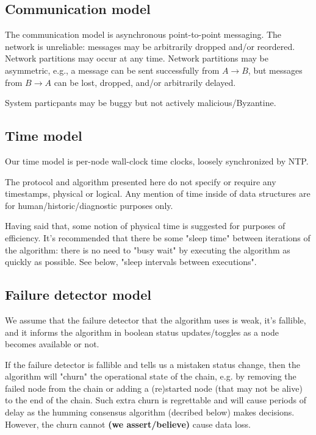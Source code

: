 \documentclass[preprint,10pt]{sigplanconf}
\begin{document}
\subsection{Communication model}

The communication model is asynchronous point-to-point messaging.
The network is unreliable: messages may be arbitrarily dropped and/or
reordered.  Network partitions may occur at any time.
Network partitions may be asymmetric, e.g., a message can be sent successfully
from $A \rightarrow B$, but messages from $B \rightarrow A$ can be
lost, dropped, and/or arbitrarily delayed.

System particpants may be buggy but not actively malicious/Byzantine.

\subsection{Time model}
\label{sub:time-model}

Our time model is per-node wall-clock time clocks, loosely
synchronized by NTP.

The protocol and algorithm presented here do not specify or require any
timestamps, physical or logical.  Any mention of time inside of data
structures are for human/historic/diagnostic purposes only.

Having said that, some notion of physical time is suggested for
purposes of efficiency.  It's recommended that there be some "sleep
time" between iterations of the algorithm: there is no need to "busy
wait" by executing the algorithm as quickly as possible.  See below,
"sleep intervals between executions".

\subsection{Failure detector model}

We assume that the failure detector that the algorithm uses is weak,
it's fallible, and it informs the algorithm in boolean status
updates/toggles as a node becomes available or not.

If the failure detector is fallible and tells us a mistaken status
change, then the algorithm will "churn" the operational state of the
chain, e.g. by removing the failed node from the chain or adding a
(re)started node (that may not be alive) to the end of the chain.
Such extra churn is regrettable and will cause periods of delay as the
humming consensus algorithm (decribed below) makes decisions.  However, the
churn cannot {\bf (we assert/believe)} cause data loss.
\end{document}
